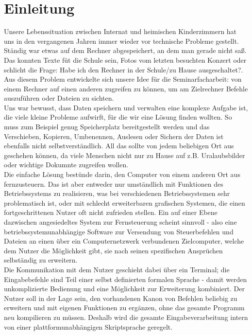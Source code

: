 %

%
\section*{Einleitung}
Unsere Lebenssituation zwischen Internat und heimischen Kinderzimmern hat uns in den vergangenen Jahren immer wieder vor technische Probleme gestellt. Ständig war etwas auf dem Rechner abgespeichert, an dem man gerade nicht saß. Das konnten Texte füt die Schule sein, Fotos vom letzten besuchten Konzert oder schlicht die Frage: \glqq Habe ich den Rechner in der Schule/zu Hause ausgeschaltet?\grqq . Aus diesem Problem entwickelte sich unsere Idee für die Seminarfacharbeit: von einem Rechner auf einen anderen zugreifen zu können, um am Zielrechner Befehle auszuführen oder Dateien zu sichten.\\
Uns war bewusst, dass Daten speichern und verwalten eine komplexe Aufgabe ist, die viele kleine Probleme aufwirft, für die wir eine Lösung finden wollten. So muss zum Beispiel genug Speicherplatz bereitgestellt werden und das Verschieben, Kopieren, Umbenennen, Auslesen oder Sichern der Daten ist ebenfalls nicht selbstverständlich. All das sollte von jedem beliebigen Ort aus geschehen können, da viele Menschen nicht nur zu Hause auf z.B. Uralaubsbilder oder wichtige Dokumnte zugreifen wollen.\\
Die einfache Lösung bestünde darin, den Computer von einem anderen Ort aus fernzusteuern. Das ist aber entweder nur umständlich mit Funktionen des Betriebssystems zu realisieren, was bei verschiedenen Betriebssystemen sehr problematisch ist, oder mit schlecht erweiterbaren grafischen Systemen, die einen fortgeschrittenen Nutzer oft nicht zufrieden stellen.
Ein auf einer Ebene dazwischen angesiedeltes System zur Fernsteuerung scheint sinnvoll - also eine betriebssystemunabhängige Software zur Versendung von Steuerbefehlen und Dateien an einen über ein Computernetzwerk verbundenen Zielcomputer, welche dem Nutzer die Möglichkeit gibt, sie nach seinen spezifischen Ansprüchen selbständig zu erweitern.\\
Die Kommunikation mit dem Nutzer geschieht dabei über ein Terminal; die Eingabebefehle sind Teil einer selbst definierten formalen Sprache - damit werden unkomplizierte Bedienung und eine Möglichkeit zur Erweiterung kombiniert.
Der Nutzer soll in der Lage sein, den vorhandenen Kanon von Befehlen beliebig zu erweitern und mit eigenen Funktionen zu ergänzen, ohne das gesamte Programm neu kompilieren zu müssen. Deshalb wird die gesamte Eingabeverarbeitung intern von einer plattformunabhängigen Skriptsprache geregelt.
